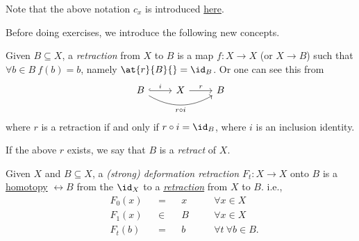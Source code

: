 \begin{remark}
	Note that the above notation \(c _{x} \) is introduced \hyperref[not:constant-loop]{here}.
\end{remark}

\begin{definition*}
	Before doing exercises, we introduce the following new concepts.
	\begin{definition}[Retraction]\label{def:retraction}
		Given \(B\subseteq X\), a \emph{retraction} from \(X\) to \(B\) is a map \(f\colon X\to X\) (or \(X\to B\)) such that \(\forall b\in B\ f(b) = b\), namely \(\at{r}{B}{} = \id_B\). Or one can see this from
		\[
			\begin{tikzcd}
				B \ar[rr, swap, bend right=30, "r \circ i"] \ar[r,hook,"i"] & X \ar[r, "r"] & B
			\end{tikzcd}
		\]
		where \(r\) is a retraction if and only if \(r\circ i = \id_B\), where \(i\) is an inclusion identity.
	\end{definition}

	\begin{definition}[Retract]\label{def:retract}
		If the above \(r\) exists, we say that \(B\) is a \emph{retract} of \(X\).
	\end{definition}

	\begin{definition}\label{def:deformation-retraction}
		Given \(X\) and \(B\subseteq X\), a \emph{(strong) deformation retraction} \(F_t\colon X\to X\) onto \(B\) is a \hyperref[def:homotopy]{homotopy} \(\rel B\) from the \(\id_X\) to a \hyperref[def:retraction]{\emph{retraction}} from \(X\) to \(B\). i.e.,
		\[
			\begin{alignedat}{4}
				 & F_0(x) &  & =   &  & x\quad &  & \forall x\in X             \\
				 & F_1(x) &  & \in &  & B\quad &  & \forall x\in X             \\
				 & F_t(b) &  & =   &  & b\quad &  & \forall t\ \forall b\in B.
			\end{alignedat}
		\]
	\end{definition}
\end{definition*}

